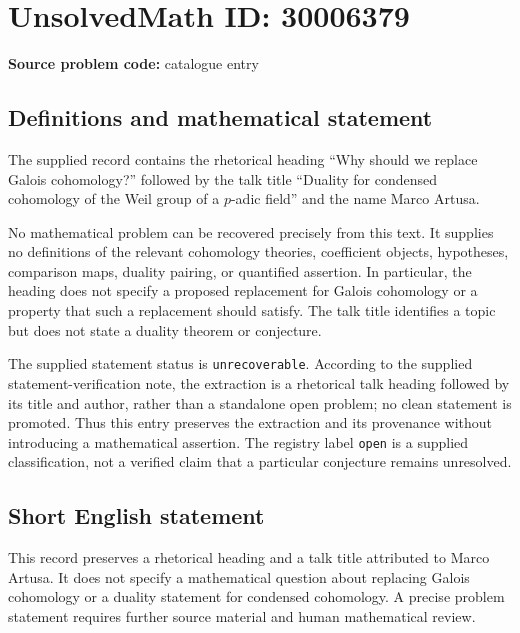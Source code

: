 \documentclass[11pt]{article}
\begin{document}
\section*{UnsolvedMath ID: 30006379}
\textbf{Source problem code:} catalogue entry
\subsection{Definitions and mathematical statement}
The supplied record contains the rhetorical heading ``Why should we replace Galois cohomology?'' followed by the talk title ``Duality for condensed cohomology of the Weil group of a \(p\)-adic field'' and the name Marco Artusa.

No mathematical problem can be recovered precisely from this text. It supplies no definitions of the relevant cohomology theories, coefficient objects, hypotheses, comparison maps, duality pairing, or quantified assertion. In particular, the heading does not specify a proposed replacement for Galois cohomology or a property that such a replacement should satisfy. The talk title identifies a topic but does not state a duality theorem or conjecture.

The supplied statement status is \texttt{unrecoverable}. According to the supplied statement-verification note, the extraction is a rhetorical talk heading followed by its title and author, rather than a standalone open problem; no clean statement is promoted. Thus this entry preserves the extraction and its provenance without introducing a mathematical assertion. The registry label \texttt{open} is a supplied classification, not a verified claim that a particular conjecture remains unresolved.
\subsection{Short English statement}
This record preserves a rhetorical heading and a talk title attributed to Marco Artusa. It does not specify a mathematical question about replacing Galois cohomology or a duality statement for condensed cohomology. A precise problem statement requires further source material and human mathematical review.
\end{document}
